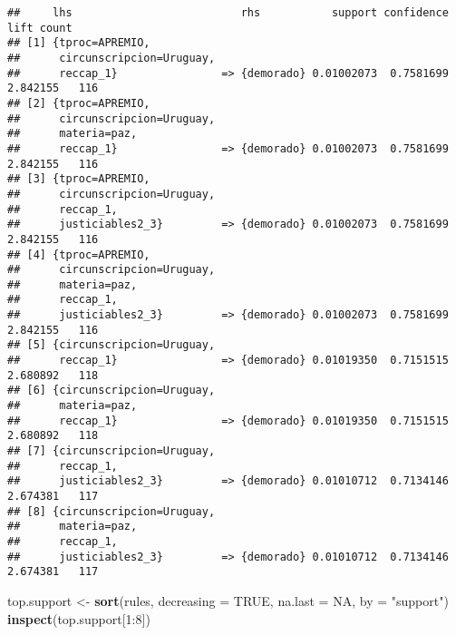 \documentclass[runningheads,a4paper]{llncs}
\newenvironment{Shaded}{}{}
\newcommand{\KeywordTok}[1]{\textcolor[rgb]{0.00,0.44,0.13}{\textbf{{#1}}}}
\newcommand{\DataTypeTok}[1]{\textcolor[rgb]{0.56,0.13,0.00}{{#1}}}
\newcommand{\DecValTok}[1]{\textcolor[rgb]{0.25,0.63,0.44}{{#1}}}
\newcommand{\StringTok}[1]{\textcolor[rgb]{0.25,0.44,0.63}{{#1}}}
\newcommand{\OtherTok}[1]{\textcolor[rgb]{0.00,0.44,0.13}{{#1}}}
\newcommand{\NormalTok}[1]{{#1}}
\newcommand{\OperatorTok}[1]{\textcolor[rgb]{0.40,0.40,0.40}{{#1}}}
\begin{document}
\begin{verbatim}
##     lhs                          rhs           support confidence     lift count
## [1] {tproc=APREMIO,                                                             
##      circunscripcion=Uruguay,                                                   
##      reccap_1}                => {demorado} 0.01002073  0.7581699 2.842155   116
## [2] {tproc=APREMIO,                                                             
##      circunscripcion=Uruguay,                                                   
##      materia=paz,                                                               
##      reccap_1}                => {demorado} 0.01002073  0.7581699 2.842155   116
## [3] {tproc=APREMIO,                                                             
##      circunscripcion=Uruguay,                                                   
##      reccap_1,                                                                  
##      justiciables2_3}         => {demorado} 0.01002073  0.7581699 2.842155   116
## [4] {tproc=APREMIO,                                                             
##      circunscripcion=Uruguay,                                                   
##      materia=paz,                                                               
##      reccap_1,                                                                  
##      justiciables2_3}         => {demorado} 0.01002073  0.7581699 2.842155   116
## [5] {circunscripcion=Uruguay,                                                   
##      reccap_1}                => {demorado} 0.01019350  0.7151515 2.680892   118
## [6] {circunscripcion=Uruguay,                                                   
##      materia=paz,                                                               
##      reccap_1}                => {demorado} 0.01019350  0.7151515 2.680892   118
## [7] {circunscripcion=Uruguay,                                                   
##      reccap_1,                                                                  
##      justiciables2_3}         => {demorado} 0.01010712  0.7134146 2.674381   117
## [8] {circunscripcion=Uruguay,                                                   
##      materia=paz,                                                               
##      reccap_1,                                                                  
##      justiciables2_3}         => {demorado} 0.01010712  0.7134146 2.674381   117
\end{verbatim}

\begin{Shaded}
\begin{Highlighting}[]
\NormalTok{top.support <-}\StringTok{ }\KeywordTok{sort}\NormalTok{(rules, }\DataTypeTok{decreasing =} \OtherTok{TRUE}\NormalTok{, }\DataTypeTok{na.last =} \OtherTok{NA}\NormalTok{, }\DataTypeTok{by =} \StringTok{"support"}\NormalTok{)}
\KeywordTok{inspect}\NormalTok{(top.support[}\DecValTok{1}\OperatorTok{:}\DecValTok{8}\NormalTok{])}
\end{Highlighting}
\end{Shaded}
\end{document}
